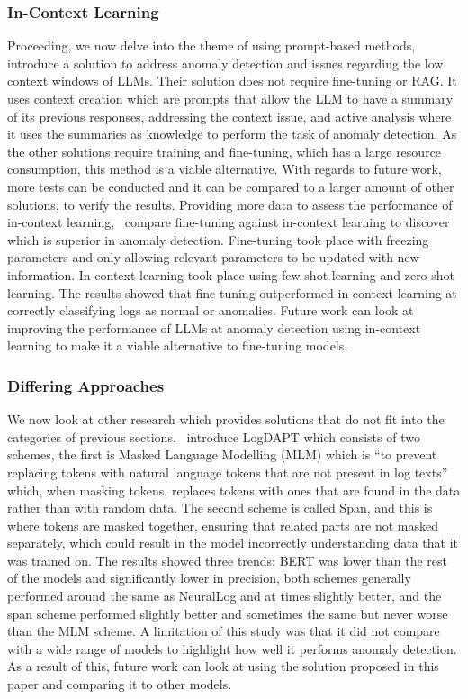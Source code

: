 \subsubsection{In-Context Learning}
Proceeding, we now delve into the theme of using prompt-based methods,~\cite{egersdoerfer2023early} introduce a solution to address anomaly detection and issues regarding the low context windows of LLMs. Their solution does not require fine-tuning or RAG. It uses context creation which are prompts that allow the LLM to have a summary of its previous responses, addressing the context issue, and active analysis where it uses the summaries as knowledge to perform the task of anomaly detection. As the other solutions require training and fine-tuning, which has a large resource consumption, this method is a viable alternative. With regards to future work, more tests can be conducted and it can be compared to a larger amount of other solutions, to verify the results. Providing more data to assess the performance of in-context learning,~\cite{jin2024large} compare fine-tuning against in-context learning to discover which is superior in anomaly detection. Fine-tuning took place with freezing parameters and only allowing relevant parameters to be updated with new information. In-context learning took place using few-shot learning and zero-shot learning. The results showed that fine-tuning outperformed in-context learning at correctly classifying logs as normal or anomalies. Future work can look at improving the performance of LLMs at anomaly detection using in-context learning to make it a viable alternative to fine-tuning models. 

\subsubsection{Differing Approaches}
We now look at other research which provides solutions that do not fit into the categories of previous sections.~\cite{zheng2023logdapt} introduce LogDAPT which consists of two schemes, the first is Masked Language Modelling (MLM) which is ``to prevent replacing tokens with natural language tokens that are not present in log texts'' which, when masking tokens, replaces tokens with ones that are found in the data rather than with random data. The second scheme is called Span, and this is where tokens are masked together, ensuring that related parts are not masked separately, which could result in the model incorrectly understanding data that it was trained on. The results showed three trends: BERT was lower than the rest of the models and significantly lower in precision, both schemes generally performed around the same as NeuralLog and at times slightly better, and the span scheme performed slightly better and sometimes the same but never worse than the MLM scheme.  A limitation of this study was that it did not compare with a wide range of models to highlight how well it performs anomaly detection. As a result of this, future work can look at using the solution proposed in this paper and comparing it to other models.

